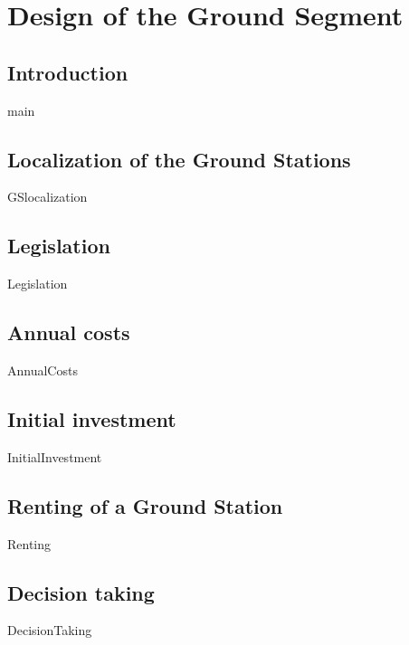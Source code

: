 \chapter{Design of the Ground Segment}

\section{Introduction}
{main}

\section{Localization of the Ground Stations}
{GSlocalization}

\section{Legislation}
{Legislation}

\section{Annual costs}
{AnnualCosts}

\section{Initial investment}
{InitialInvestment}

\section{Renting of a Ground Station}
{Renting}

\section{Decision taking}
{DecisionTaking}

%
%
